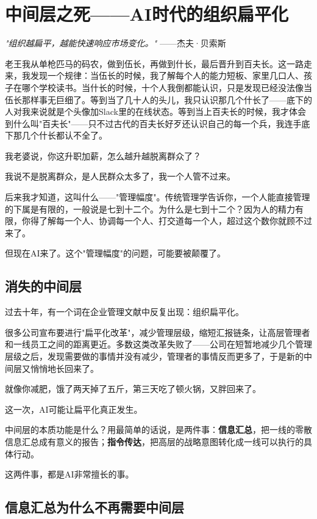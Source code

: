 \chapter{中间层之死——AI时代的组织扁平化}


\textit{"组织越扁平，越能快速响应市场变化。"}
——杰夫·贝索斯


老王我从单枪匹马的码农，做到伍长，再做到什长，最后晋升到百夫长。这一路走来，我发现一个规律：当伍长的时候，我了解每个人的能力短板、家里几口人、孩子在哪个学校读书。当什长的时候，十个人我倒都能认识，只是发现已经没法像当伍长那样事无巨细了。等到当了几十人的头儿，我只认识那几个什长了——底下的人对我来说就是个头像加Slack里的在线状态。等到当上百夫长的时候，我才体会到什么叫"百夫长"——只不过古代的百夫长好歹还认识自己的每一个兵，我连手底下那几个什长都认不全了。

我老婆说，你这升职加薪，怎么越升越脱离群众了？

我说不是脱离群众，是人民群众太多了，我一个人管不过来。

后来我才知道，这叫什么——"管理幅度"。传统管理学告诉你，一个人能直接管理的下属是有限的，一般说是七到十二个。为什么是七到十二个？因为人的精力有限，你得了解每一个人、协调每一个人、打交道每一个人，超过这个数你就顾不过来了。

但现在AI来了。这个"管理幅度"的问题，可能要被颠覆了。

\section{消失的中间层}


过去十年，有一个词在企业管理文献中反复出现：组织扁平化。

很多公司宣布要进行"扁平化改革"，减少管理层级，缩短汇报链条，让高层管理者和一线员工之间的距离更近。多数这类改革失败了——公司在短暂地减少几个管理层级之后，发现需要做的事情并没有减少，管理者的事情反而更多了，于是新的中间层又悄悄地长回来了。

就像你减肥，饿了两天掉了五斤，第三天吃了顿火锅，又胖回来了。

这一次，AI可能让扁平化真正发生。

中间层的本质功能是什么？用最简单的话说，是两件事：\textbf{信息汇总}，把一线的零散信息汇总成有意义的报告；\textbf{指令传达}，把高层的战略意图转化成一线可以执行的具体行动。

这两件事，都是AI非常擅长的事。

\section{信息汇总为什么不再需要中间层}


